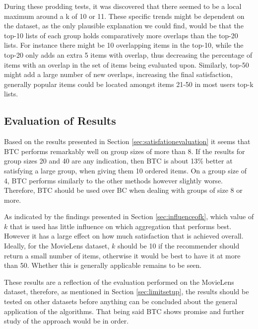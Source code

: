 During these prodding tests, it was discovered that there seemed to be a local maximum around a k of 10 or 11. These specific trends might be dependent on the dataset, as the only plausible explanation we could find, would be that the top-10 lists of each group holds comparatively more overlaps than the top-20 lists. For instance there might be 10 overlapping items in the top-10, while the top-20 only adds an extra 5 items with overlap, thus decreasing the percentage of items with an overlap in the set of items being evaluated upon. Similarly, top-50 might add a large number of new overlaps, increasing the final satisfaction, generally popular items could be located amongst items 21-50 in most users top-k lists.

\subsection{Evaluation of Results} \label{sec:evaluationofresults}
Based on the results presented in Section \ref{sec:satisfationevaluation} it seems that BTC performs remarkably well on group sizes of more than 8. If the results for group sizes 20 and 40 are any indication, then BTC is about 13\% better at satisfying a large group, when giving them 10 ordered items. On a group size of 4, BTC performs similarly to the other methods however slightly worse. Therefore, BTC should be used over BC when dealing with groups of size 8 or more.

As indicated by the findings presented in Section \ref{sec:influenceofk}, which value of $k$ that is used has little influence on which aggregation that performs best. However it has a large effect on how much satisfaction that is achieved overall. Ideally, for the MovieLens dataset, $k$ should be 10 if the recommender should return a small number of items, otherwise it would be best to have it at more than 50. Whether this is generally applicable remains to be seen.

These results are a reflection of the evaluation performed on the MovieLens dataset, therefore, as mentioned in Section \ref{sec:limitsetup}, the results should be tested on other datasets before anything can be concluded about the general application of the algorithms. That being said BTC shows promise and further study of the approach would be in order. 









